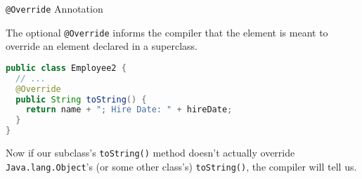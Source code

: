 \documentclass{beamer}
\begin{document}
\begin{frame}[fragile]{{\tt @Override} Annotation}

The optional {\tt @Override}  informs the compiler that the element is meant to override an element declared in a superclass.

\begin{lstlisting}[language=Java]
public class Employee2 {
  // ...
  @Override
  public String toString() {
    return name + "; Hire Date: " + hireDate;
  }
}
\end{lstlisting}
Now if our subclass's {\tt toString()} method doesn't actually override {\tt Java.lang.Object}'s (or some other class's) {\tt toString()}, the compiler will tell us.
\end{frame}





\end{document}
